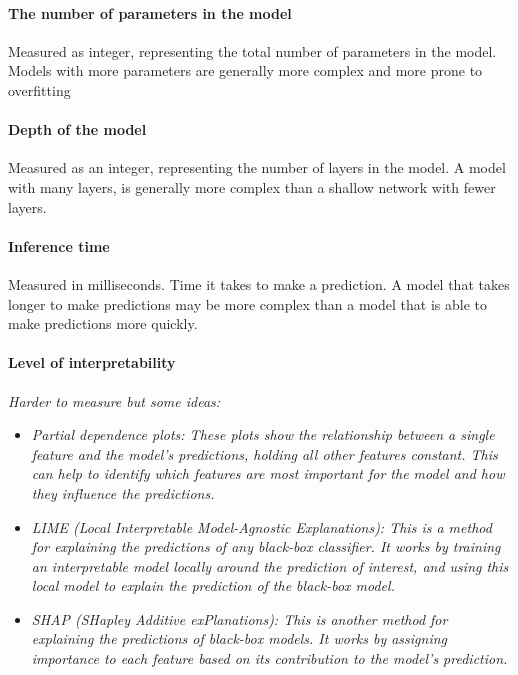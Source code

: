 \paragraph*{The number of parameters in the model}
Measured as integer, representing the total number of parameters in the model.
Models with more parameters are generally more complex and more prone to overfitting

\paragraph*{Depth of the model}
Measured as an integer, representing the number of layers in the model.
A model with many layers, is generally more complex than a shallow network with fewer layers.

\paragraph*{Inference time}
Measured in milliseconds. Time it takes to make a prediction.
A model that takes longer to make predictions may be more complex than a model that is able to make predictions more quickly.

\paragraph*{Level of interpretability}
\textit{Harder to measure but some ideas: }
\begin{itemize}
    \item \textit{Partial dependence plots: These plots show the relationship between a single feature and the model's predictions, holding all other features constant. This can help to identify which features are most important for the model and how they influence the predictions.}
    \item \textit{LIME (Local Interpretable Model-Agnostic Explanations): This is a method for explaining the predictions of any black-box classifier. It works by training an interpretable model locally around the prediction of interest, and using this local model to explain the prediction of the black-box model.}
    \item \textit{SHAP (SHapley Additive exPlanations): This is another method for explaining the predictions of black-box models. It works by assigning importance to each feature based on its contribution to the model's prediction.}

\end{itemize}


